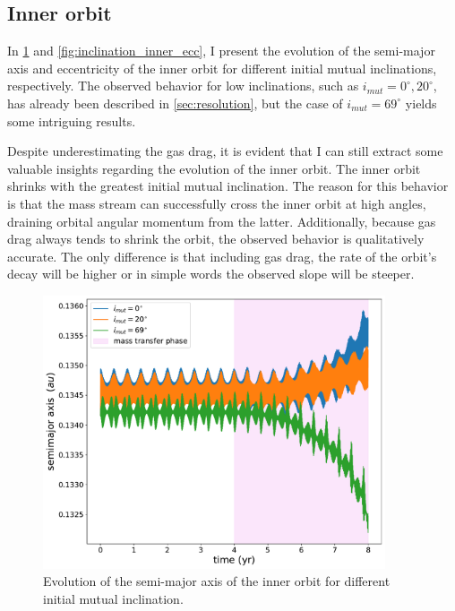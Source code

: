 \subsection{Inner orbit}

In \cref{fig:inclination_inner_semimajor_axis} and \cref{fig:inclination_inner_ecc}, I present the evolution of the semi-major axis and eccentricity of the inner orbit for different initial mutual inclinations, respectively. The observed behavior for low inclinations, such as $i_{mut}=0^{\circ}, 20^{\circ}$, has already been described in \cref{sec:resolution}, but the case of $i_{mut}=69^{\circ}$ yields some intriguing results.

Despite underestimating the gas drag, it is evident that I can still extract some valuable insights regarding the evolution of the inner orbit. The inner orbit shrinks with the greatest initial mutual inclination. The reason for this behavior is that the mass stream can successfully cross the inner orbit at high angles, draining orbital angular momentum from the latter. Additionally, because gas drag always tends to shrink the orbit, the observed behavior is qualitatively accurate. The only difference is that including gas drag, the rate of the orbit's decay will be higher or in simple words the observed slope will be steeper. 
\begin{figure}[H]
    \centering
    \includegraphics[width=0.9\textwidth]{Thesis/graphs/inclination_case/inclination_inner_semimajor_axis.pdf}
    \caption{Evolution of the semi-major axis of the inner orbit for different initial mutual inclination.}
    \label{fig:inclination_inner_semimajor_axis}
\end{figure}

